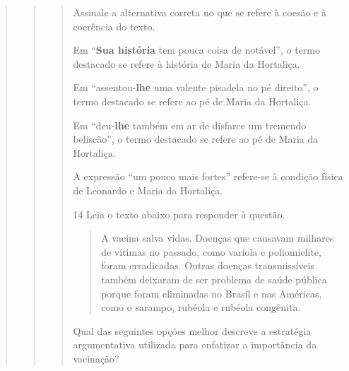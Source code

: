 \begin{quote}
\begin{quote}
\begin{quote}
Assinale a alternativa correta no que se refere à coesão e à coerência 
do texto. 

\begin{escolha}

\item
  Em ``\textbf{Sua história} tem pouca coisa de notável'', o termo destacado
  se refere à história de Maria da Hortaliça.
\item
  Em ``assentou-\textbf{lhe} uma valente pisadela no pé direito'', o termo destacado
  se refere ao pé de Maria da Hortaliça.
\item
  Em ``deu-\textbf{lhe} também em ar de disfarce um tremendo beliscão'', o termo 
  destacado se refere ao pé de Maria da Hortaliça.
\item
  A expressão ``um pouco mais fortes'' refere-se à condição física de Leonardo e 
  Maria da Hortaliça.

\end{escolha}


\num{14} Leia o texto abaixo para responder à questão. 

\begin{quote}

A vacina salva vidas. Doenças que causavam milhares de vítimas no
passado, como varíola e poliomielite, foram erradicadas. Outras doenças
transmissíveis também deixaram de ser problema de saúde pública porque
foram eliminadas no Brasil e nas Américas, como o sarampo, rubéola e
rubéola congênita.

\end{quote}


Qual das seguintes opções melhor descreve a estratégia argumentativa
utilizada para enfatizar a importância da vacinação?


\end{quote}
\end{quote}
\end{quote}
